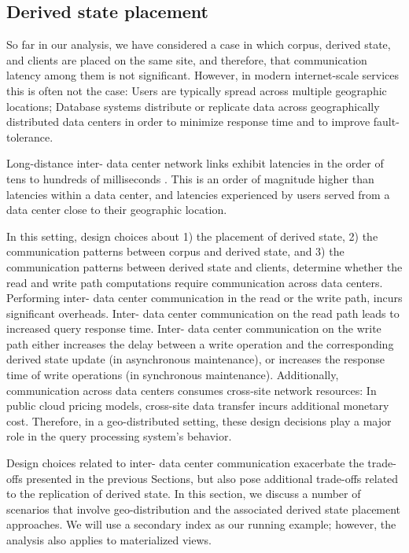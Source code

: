 \subsection{Derived state placement}
\label{sec:topology_patterns}


So far in our analysis,
we have considered a case in which corpus, derived state, and clients are placed on the same site,
and therefore, that communication latency among them is not significant.
However, in modern internet-scale services this is often not the case:
Users are typically spread across multiple geographic locations;
Database systems distribute or replicate data across geographically distributed data centers
in order to minimize response time and to improve fault-tolerance.

Long-distance inter- data center network links exhibit latencies in the order of tens to hundreds of milliseconds \cite{pbailis:hats}.
This is an order of magnitude higher than latencies within a data center,
and latencies experienced by users served from a data center close to their geographic location.

In this setting, design choices about 1) the placement of derived state,
2) the communication patterns between corpus and derived state, and 3) the communication patterns between derived state and clients,
determine whether the read and write path computations require communication across data centers.
Performing inter- data center communication in the read or the write path,
incurs significant overheads.
Inter- data center communication on the read path leads to increased query response time.
Inter- data center communication on the write path either increases the delay between a write operation and the corresponding
derived state update (in asynchronous maintenance),
or increases the response time of write operations (in synchronous maintenance).
Additionally, communication across data centers consumes cross-site network resources:
In public cloud pricing models, cross-site data transfer incurs additional monetary cost.
Therefore, in a geo-distributed setting,
these design decisions play a major role in the query processing system's behavior.

Design choices related to inter- data center communication exacerbate the trade-offs presented in the previous Sections,
but also pose additional trade-offs related to the replication of derived state.
In this section, we discuss a number of scenarios that involve geo-distribution and the associated derived state placement approaches.
We will use a secondary index as our running example; however, the analysis also applies to materialized views.

